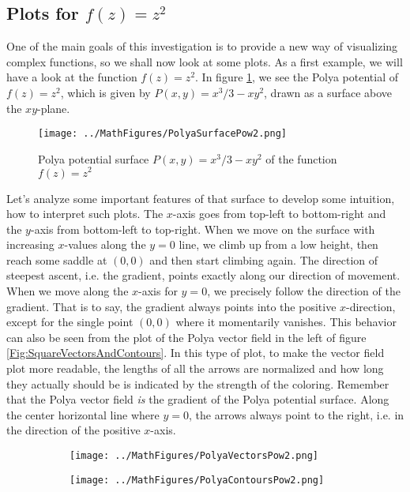 \documentclass[12pt]{article}
\begin{document}
\subsection{Plots for $f(z) = z^2$}
One of the main goals of this investigation is to provide a new way of visualizing complex functions, so we shall now look at some plots. As a first example, we will have a look at the function $f(z) = z^2$. In figure \ref{Fig:SquareSurface}, we see the Polya potential of $f(z) = z^2$, which is given by $P(x,y) = x^3/3 - x y^2$, drawn as a surface above the $xy$-plane. 
\begin{figure}[h]
\caption{Polya potential surface $P(x,y) = x^3/3 - x y^2$ of the function $f(z) = z^2$}	
\label{Fig:SquareSurface}	
\centering
\texttt{[image: ../MathFigures/PolyaSurfacePow2.png]}
\end{figure}
Let's analyze some important features of that surface to develop some intuition, how to interpret such plots. The $x$-axis goes from top-left to bottom-right and the $y$-axis from bottom-left to top-right. When we move on the surface with increasing $x$-values along the $y=0$ line, we climb up from a low height, then reach some saddle at $(0,0)$ and then start climbing again. The direction of steepest ascent, i.e. the gradient, points exactly along our direction of movement. When we move along the $x$-axis for $y=0$, we precisely follow the direction of the gradient. That is to say, the gradient always points into the positive $x$-direction, except for the single point $(0,0)$ where it momentarily vanishes. This behavior can also be seen from the plot of the Polya vector field in the left of figure \ref{Fig:SquareVectorsAndContours}. In this type of plot, to make the vector field plot more readable, the lengths of all the arrows are normalized and how long they actually should be is indicated by the strength of the coloring. Remember that the Polya vector field \emph{is} the gradient of the Polya potential surface. Along the center horizontal line where $y=0$, the arrows always point to the right, i.e. in the direction of the positive $x$-axis.
\begin{figure}[h]
\caption{Polya vector field and Polya potential contours of $f(z) = z^2$}	
\label{Fig:SquareVectorsAndContours}	
\centering
\begin{subfigure}[b]{0.49\textwidth}
\centering
\texttt{[image: ../MathFigures/PolyaVectorsPow2.png]} 
\end{subfigure}
\begin{subfigure}[b]{0.49\textwidth}
\centering
\texttt{[image: ../MathFigures/PolyaContoursPow2.png]}
\end{subfigure}
\end{figure}
\end{document}
